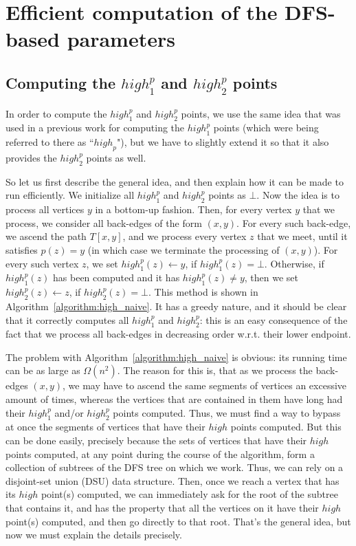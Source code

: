 \documentclass[11pt,a4paper]{article}
\begin{document}
\section{Efficient computation of the DFS-based parameters}
\label{section:efficient_computation}

\subsection{Computing the $\mathit{high}^p_1$ and $\mathit{high}^p_2$ points}
\label{section:computeHigh}
In order to compute the $\mathit{high}^p_1$ and $\mathit{high}^p_2$ points, we use the same idea that was used in a previous work for computing the $\mathit{high}^p_1$ points \cite{DBLP:conf/isaac/GeorgiadisK20} (which were being referred to there as ``$\mathit{high}_p$"), but we have to slightly extend it so that it also provides the $\mathit{high}^p_2$ points as well.

So let us first describe the general idea, and then explain how it can be made to run efficiently. We initialize all $\mathit{high}^p_1$ and $\mathit{high}^p_2$ points as $\bot$. Now the idea is to process all vertices $y$ in a bottom-up fashion. Then, for every vertex $y$ that we process, we consider all back-edges of the form $(x,y)$. For every such back-edge, we ascend the path $T[x,y]$, and we process every vertex $z$ that we meet, until it satisfies $p(z)= y$ (in which case we terminate the processing of $(x,y)$). For every such vertex $z$, we set $\mathit{high}^p_1(z)\leftarrow y$, if $\mathit{high}^p_1(z)=\bot$. Otherwise, if $\mathit{high}^p_1(z)$ has been computed and it has $\mathit{high}^p_1(z)\neq y$, then we set $\mathit{high}^p_2(z)\leftarrow z$, if $\mathit{high}^p_2(z)=\bot$. This method is shown in Algorithm~\ref{algorithm:high_naive}. It has a greedy nature, and it should be clear that it correctly computes all $\mathit{high}^p_1$ and $\mathit{high}^p_2$: this is an easy consequence of the fact that we process all back-edges in decreasing order w.r.t. their lower endpoint.



The problem with Algorithm~\ref{algorithm:high_naive} is obvious: its running time can be as large as $\Omega(n^2)$. The reason for this is, that as we process the back-edges $(x,y)$, we may have to ascend the same segments of vertices an excessive amount of times, whereas the vertices that are contained in them have long had their $\mathit{high}^p_1$ and/or $\mathit{high}^p_2$ points computed. Thus, we must find a way to bypass at once the segments of vertices that have their $\mathit{high}$ points computed. But this can be done easily, precisely because the sets of vertices that have their $\mathit{high}$ points computed, at any point during the course of the algorithm, form a collection of subtrees of the DFS tree on which we work. Thus, we can rely on a disjoint-set union (DSU) data structure. Then, once we reach a vertex that has its $\mathit{high}$ point(s) computed, we can immediately ask for the root of the subtree that contains it, and has the property that all the vertices on it have their $\mathit{high}$ point(s) computed, and then go directly to that root. That's the general idea, but now we must explain the details precisely.
\end{document}
